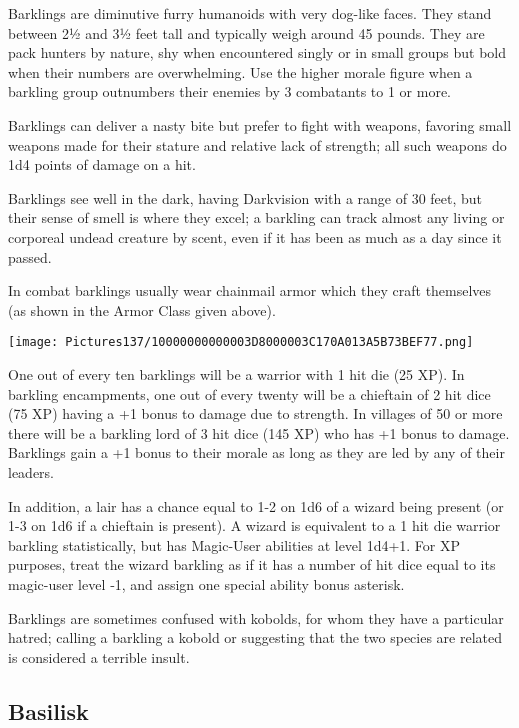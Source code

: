 \documentclass[a4paper,twoside,openany,10pt]{book}
\begin{document}
\begin{multicols}{2}
Barklings are diminutive furry humanoids with very dog-like faces. They stand between 2½ and 3½ feet tall and typically weigh around 45 pounds. They are pack hunters by nature, shy when encountered singly or in small groups but bold when their numbers are overwhelming. Use the higher morale figure when a barkling group outnumbers their enemies by 3 combatants to 1 or more.

Barklings can deliver a nasty bite but prefer to fight with weapons, favoring small weapons made for their stature and relative lack of strength; all such weapons do 1d4 points of damage on a hit. 

Barklings see well in the dark, having Darkvision with a range of 30 feet, but their sense of smell is where they excel; a barkling can track almost any living or corporeal undead creature by scent, even if it has been as much as a day since it passed.

In combat barklings usually wear chainmail armor which they craft themselves (as shown in the Armor Class given above).


\begin{center}
	\texttt{[image: Pictures137/10000000000003D8000003C170A013A5B73BEF77.png]}
\end{center}


One out of every ten barklings will be a warrior with 1 hit die (25 XP). In barkling encampments, one out of every twenty will be a chieftain of 2 hit dice (75 XP) having a +1 bonus to damage due to strength. In villages of 50 or more there will be a barkling lord of 3 hit dice (145 XP) who has +1 bonus to damage. Barklings gain a +1 bonus to their morale as long as they are led by any of their leaders.

In addition, a lair has a chance equal to 1-2 on 1d6 of a wizard being present (or 1-3 on 1d6 if a chieftain is present). A wizard is equivalent to a 1 hit die warrior barkling statistically, but has Magic-User abilities at level 1d4+1. For XP purposes, treat the wizard barkling as if it has a number of hit dice equal to its magic-user level ‑1, and assign one special ability bonus asterisk.

Barklings are sometimes confused with kobolds, for whom they have a particular hatred; calling a barkling a kobold or suggesting that the two species are related is considered a terrible insult.\\

\subsection*{Basilisk}\label{basilisk}


\end{multicols}
\end{document}
